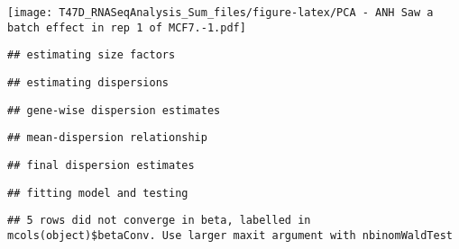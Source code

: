 \documentclass[]{article}
\newenvironment{Shaded}{\begin{snugshade}}{\end{snugshade}}
\newcommand{\KeywordTok}[1]{\textcolor[rgb]{0.13,0.29,0.53}{\textbf{#1}}}
\newcommand{\DataTypeTok}[1]{\textcolor[rgb]{0.13,0.29,0.53}{#1}}
\newcommand{\StringTok}[1]{\textcolor[rgb]{0.31,0.60,0.02}{#1}}
\newcommand{\CommentTok}[1]{\textcolor[rgb]{0.56,0.35,0.01}{\textit{#1}}}
\newcommand{\OperatorTok}[1]{\textcolor[rgb]{0.81,0.36,0.00}{\textbf{#1}}}
\newcommand{\NormalTok}[1]{#1}
\begin{document}
\texttt{[image: T47D\_RNASeqAnalysis\_Sum\_files/figure-latex/PCA - ANH Saw a batch effect in rep 1 of MCF7.-1.pdf]}

\begin{Shaded}
\end{Shaded}

\begin{verbatim}
## estimating size factors
\end{verbatim}

\begin{verbatim}
## estimating dispersions
\end{verbatim}

\begin{verbatim}
## gene-wise dispersion estimates
\end{verbatim}

\begin{verbatim}
## mean-dispersion relationship
\end{verbatim}

\begin{verbatim}
## final dispersion estimates
\end{verbatim}

\begin{verbatim}
## fitting model and testing
\end{verbatim}

\begin{verbatim}
## 5 rows did not converge in beta, labelled in mcols(object)$betaConv. Use larger maxit argument with nbinomWaldTest
\end{verbatim}
\end{document}
